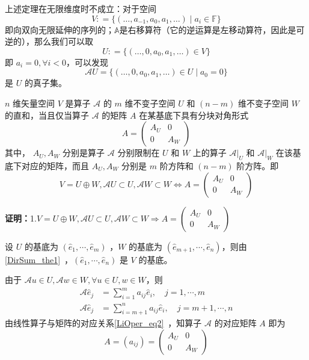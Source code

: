 \begin{example}{}
上述定理在无限维度时不成立：对于空间
$$
V: = \{ (\dots, a_{-1}, a_0, a_1, \dots) \mid a_i \in \mathbb{F}\}
$$
即向双向无限延伸的序列的；$\mathbb{A}$是右移算符（它的逆运算是左移动算符，因此是可逆的），那么我们可以取
$$
U: = \{ (\dots, 0, a_0, a_1, \dots) \in V \}
$$
即 $a_i = 0, \forall i < 0$，可以发现
$$
\mathcal{A} U = \{ (\dots, 0, a_0, a_1, \dots) \in U \mid a_0 = 0 \}
$$
是 $U$ 的真子集。
\end{example}


\begin{theorem}{}\label{InvSP_the1}
$n$ 维矢量空间 $V$ 是算子 $\mathcal{A}$ 的 $m$ 维不变子空间 $U$ 和 $(n-m)$ 维不变子空间 $W$ 的直和，当且仅当算子 $\mathcal{A}$ 的矩阵 $A$ 在某基底下具有分块对角形式
\begin{equation}\label{InvSP_eq1}
A=\begin{pmatrix}
A_U&0\\
0&A_W
\end{pmatrix}
\end{equation}
其中， $A_U,A_W$ 分别是算子 $\mathcal{A}$ 分别限制在 $U$ 和 $W$ 上的算子 $\mathcal{A}|_U$ 和 $\mathcal{A}|_W$ 在该基底下对应的矩阵，而且 $A_U,A_W$ 分别是 $m$ 阶方阵和 $(n-m)$ 阶方阵。即
\begin{equation}
V=U\oplus W,\mathcal{A}U\subset U,\mathcal{A}W\subset W\Leftrightarrow A=\begin{pmatrix}
A_U&0\\
0&A_W
\end{pmatrix}
\end{equation}

\end{theorem}

\textbf{证明：}1.$
V=U\oplus W,\mathcal{A}U\subset U,\mathcal{A}W\subset W\Rightarrow A=\begin{pmatrix}
A_U&0\\
0&A_W
\end{pmatrix}
$

设 $U$ 的基底为 $(\hat e_1,\cdots,\hat e_m)$ ，$W$ 的基底为 $(\hat e_{m+1},\cdots,\hat e_n)$，则由\autoref{DirSum_the1}~，$(\hat e_{1},\cdots,\hat e_n)$ 是 $V$ 的基底。

由于 $\mathcal{A}u\in U, \mathcal{A} w\in W,\forall  u\in U, w\in W$，则
\begin{equation}\label{InvSP_eq2}
\begin{aligned}
\mathcal{A}\hat e_j&=\sum_{i=1}^m a_{ij}\hat e_i,\quad j=1,\cdots ,m\\
\mathcal{A}\hat e_j&=\sum_{i=m+1}^n a_{ij}\hat e_i,\quad j=m+1,\cdots ,n
\end{aligned}
\end{equation}
由线性算子与矩阵的对应关系\autoref{LiOper_eq2}~，知算子 $\mathcal{A}$ 的对应矩阵 $A$ 即为 
\begin{equation}
A=(a_{ij})=\begin{pmatrix}
A_U&0\\
0&A_W
\end{pmatrix}
\end{equation}

